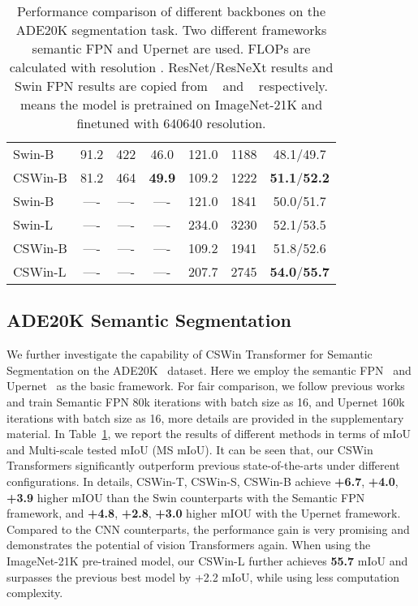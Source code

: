\documentclass[10pt,twocolumn,letterpaper]{article}
\newcommand{\Tref}[1]{Table~\ref{#1}}
\begin{document}
\begin{table}[t]
{{\begin{tabular}[t]{l|ccc|ccc}
Swin-B~\cite{liu2021swin}           & 91.2 & 422 & 46.0 & 121.0 & 1188 & 48.1/49.7 \\
\rowcolor{Graylight} 
CSWin-B                      & 81.2 & 464 & \textbf{49.9} & 109.2 & 1222 & \textbf{51.1}/\textbf{52.2} \\
\midrule
Swin-B~\cite{liu2021swin}           & ----  & ---- & ---- & 121.0 & 1841 & 50.0/51.7 \\
Swin-L~\cite{liu2021swin}           & ----  & ---- & ---- & 234.0 & 3230 & 52.1/53.5 \\
\rowcolor{Graylight} 
CSWin-B                       & ----  & ---- & ---- & 109.2 & 1941 & 51.8/52.6\\
\rowcolor{Graylight} 
CSWin-L                       & ----  & ---- & ---- & 207.7 & 2745 & \textbf{54.0}/\textbf{55.7}\\
\bottomrule
\end{tabular}}}
\vspace{-3mm}
\caption{Performance comparison of different backbones on the ADE20K segmentation task. Two different frameworks semantic FPN and Upernet are used. FLOPs are calculated with resolution . ResNet/ResNeXt results and Swin FPN results are copied from ~\cite{wang2021pyramid} and ~\cite{chu2021twins} respectively.  means the model is pretrained on ImageNet-21K and finetuned with 640640 resolution.}
\vspace{-3mm}
\label{tab:segmentation}
\end{table}



\subsection{ADE20K Semantic Segmentation}
We further investigate the capability of CSWin Transformer for Semantic Segmentation on the ADE20K~\cite{zhou2017scene} dataset. Here we employ the semantic FPN~\cite{kirillov2019panoptic} and Upernet~\cite{xiao2018upernet} as the basic framework. For fair comparison, we follow previous works~\cite{wang2021pyramid,liu2021swin} and train Semantic FPN 80k iterations with batch size as 16, and Upernet 160k iterations with batch size as 16, more details are provided in the supplementary material. In \Tref{tab:segmentation}, we report the results of different methods in terms of mIoU and Multi-scale tested mIoU (MS mIoU). It can be seen that, our CSWin Transformers significantly outperform previous state-of-the-arts under different configurations. In details, CSWin-T, CSWin-S, CSWin-B achieve \textbf{+6.7}, \textbf{+4.0}, \textbf{+3.9} higher mIOU than the Swin counterparts with the Semantic FPN framework, and \textbf{+4.8}, \textbf{+2.8}, \textbf{+3.0} higher mIOU with the Upernet framework. Compared to the CNN counterparts, the performance gain is very promising and demonstrates the potential of vision Transformers again. When using the ImageNet-21K pre-trained model, our CSWin-L further achieves \textbf{55.7} mIoU  and surpasses the previous best model by +2.2 mIoU, while using less computation complexity.
\end{document}

